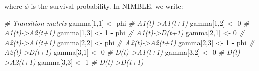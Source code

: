 \documentclass[
  12pt,
]{krantz}
\newenvironment{Shaded}{\begin{snugshade}}{\end{snugshade}}
\newcommand{\CommentTok}[1]{\textcolor[rgb]{0.56,0.35,0.01}{\textit{#1}}}
\newcommand{\DecValTok}[1]{\textcolor[rgb]{0.00,0.00,0.81}{#1}}
\newcommand{\NormalTok}[1]{#1}
\newcommand{\OtherTok}[1]{\textcolor[rgb]{0.56,0.35,0.01}{#1}}
\newcommand{\SpecialCharTok}[1]{\textcolor[rgb]{0.81,0.36,0.00}{\textbf{#1}}}
\begin{document}
where \(\phi\) is the survival probability. In NIMBLE, we write:

\begin{Shaded}
\begin{Highlighting}[]
\CommentTok{\# Transition matrix}
\NormalTok{gamma[}\DecValTok{1}\NormalTok{,}\DecValTok{1}\NormalTok{] }\OtherTok{\textless{}{-}}\NormalTok{ phi      }\CommentTok{\# A1(t){-}\textgreater{}A1(t+1)}
\NormalTok{gamma[}\DecValTok{1}\NormalTok{,}\DecValTok{2}\NormalTok{] }\OtherTok{\textless{}{-}} \DecValTok{0}        \CommentTok{\# A1(t){-}\textgreater{}A2(t+1)}
\NormalTok{gamma[}\DecValTok{1}\NormalTok{,}\DecValTok{3}\NormalTok{] }\OtherTok{\textless{}{-}} \DecValTok{1} \SpecialCharTok{{-}}\NormalTok{ phi  }\CommentTok{\# A1(t){-}\textgreater{}D(t+1)}
\NormalTok{gamma[}\DecValTok{2}\NormalTok{,}\DecValTok{1}\NormalTok{] }\OtherTok{\textless{}{-}} \DecValTok{0}        \CommentTok{\# A2(t){-}\textgreater{}A1(t+1)}
\NormalTok{gamma[}\DecValTok{2}\NormalTok{,}\DecValTok{2}\NormalTok{] }\OtherTok{\textless{}{-}}\NormalTok{ phi      }\CommentTok{\# A2(t){-}\textgreater{}A2(t+1)}
\NormalTok{gamma[}\DecValTok{2}\NormalTok{,}\DecValTok{3}\NormalTok{] }\OtherTok{\textless{}{-}} \DecValTok{1} \SpecialCharTok{{-}}\NormalTok{ phi  }\CommentTok{\# A2(t){-}\textgreater{}D(t+1)}
\NormalTok{gamma[}\DecValTok{3}\NormalTok{,}\DecValTok{1}\NormalTok{] }\OtherTok{\textless{}{-}} \DecValTok{0}        \CommentTok{\# D(t){-}\textgreater{}A1(t+1)}
\NormalTok{gamma[}\DecValTok{3}\NormalTok{,}\DecValTok{2}\NormalTok{] }\OtherTok{\textless{}{-}} \DecValTok{0}        \CommentTok{\# D(t){-}\textgreater{}A2(t+1)}
\NormalTok{gamma[}\DecValTok{3}\NormalTok{,}\DecValTok{3}\NormalTok{] }\OtherTok{\textless{}{-}} \DecValTok{1}        \CommentTok{\# D(t){-}\textgreater{}D(t+1)}
\end{Highlighting}
\end{Shaded}
\end{document}
